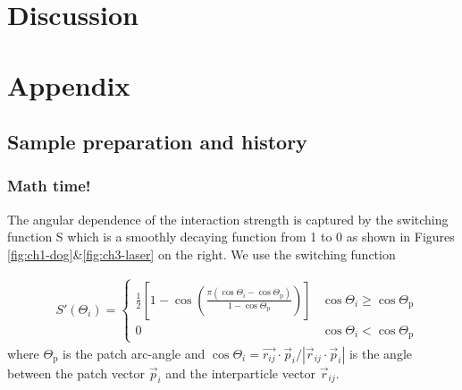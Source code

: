 \section{Discussion}
\blindtext[2]

\clearpage

\section{Appendix}

\subsection{Sample preparation and history}

\blindtext[2]

\subsubsection{Math time!}

\blindtext[2]

The angular dependence of the interaction strength is captured by the switching function S which is a smoothly decaying function from 1 to 0 as shown in Figures \ref{fig:ch1-dog}\&\ref{fig:ch3-laser} on the right. We use the switching function

\begin{align}
  &S'(\Theta_i)=
  \begin{cases}
    \frac{1}{2} \left[ 1-\cos \left( \frac{\pi(\cos\Theta_i -\cos\Theta_\mathrm{p})}{1-\cos\Theta_\mathrm{p}} \right) \right]  &  \cos\Theta_i\geq \cos\Theta_\mathrm{p} \\
    0& \cos\Theta_i<\cos\Theta_\mathrm{p}
  \end{cases} \label{eq:ch3-switchfunction}
\end{align}
where $\Theta_\mathrm{p}$ is the patch arc-angle and $\cos\Theta_i=\vec{r_{ij}}\cdot\vec{p}_i/ |\vec{r}_{ij}\cdot\vec{p}_i|$ is the angle between the patch vector $\vec{p}_i$ and the interparticle vector $\vec{r}_{ij}$.